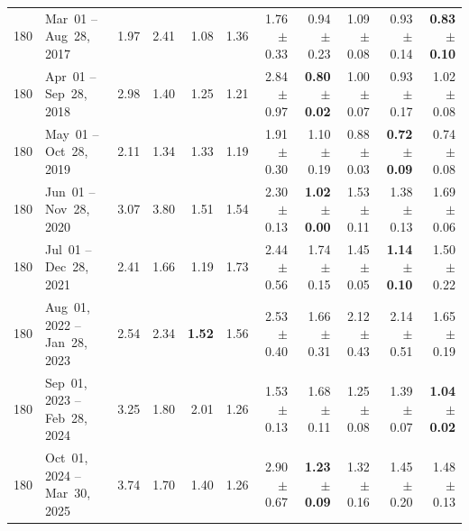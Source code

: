 \begin{longtable}{r l r r r r r r r r r}
180 & Mar~01 -- Aug~28, 2017 & 1.97 & 2.41 & 1.08 & 1.36 & 1.76{\tiny$\pm$0.33} & 0.94{\tiny$\pm$0.23} & 1.09{\tiny$\pm$0.08} & 0.93{\tiny$\pm$0.14} & \textbf{0.83{\tiny$\pm$0.10}} \\
180 & Apr~01 -- Sep~28, 2018 & 2.98 & 1.40 & 1.25 & 1.21 & 2.84{\tiny$\pm$0.97} & \textbf{0.80{\tiny$\pm$0.02}} & 1.00{\tiny$\pm$0.07} & 0.93{\tiny$\pm$0.17} & 1.02{\tiny$\pm$0.08} \\
180 & May~01 -- Oct~28, 2019 & 2.11 & 1.34 & 1.33 & 1.19 & 1.91{\tiny$\pm$0.30} & 1.10{\tiny$\pm$0.19} & 0.88{\tiny$\pm$0.03} & \textbf{0.72{\tiny$\pm$0.09}} & 0.74{\tiny$\pm$0.08} \\
180 & Jun~01 -- Nov~28, 2020 & 3.07 & 3.80 & 1.51 & 1.54 & 2.30{\tiny$\pm$0.13} & \textbf{1.02{\tiny$\pm$0.00}} & 1.53{\tiny$\pm$0.11} & 1.38{\tiny$\pm$0.13} & 1.69{\tiny$\pm$0.06} \\
180 & Jul~01 -- Dec~28, 2021 & 2.41 & 1.66 & 1.19 & 1.73 & 2.44{\tiny$\pm$0.56} & 1.74{\tiny$\pm$0.15} & 1.45{\tiny$\pm$0.05} & \textbf{1.14{\tiny$\pm$0.10}} & 1.50{\tiny$\pm$0.22} \\
180 & Aug~01, 2022 -- Jan~28, 2023 & 2.54 & 2.34 & \textbf{1.52} & 1.56 & 2.53{\tiny$\pm$0.40} & 1.66{\tiny$\pm$0.31} & 2.12{\tiny$\pm$0.43} & 2.14{\tiny$\pm$0.51} & 1.65{\tiny$\pm$0.19} \\
180 & Sep~01, 2023 -- Feb~28, 2024 & 3.25 & 1.80 & 2.01 & 1.26 & 1.53{\tiny$\pm$0.13} & 1.68{\tiny$\pm$0.11} & 1.25{\tiny$\pm$0.08} & 1.39{\tiny$\pm$0.07} & \textbf{1.04{\tiny$\pm$0.02}} \\
180 & Oct~01, 2024 -- Mar~30, 2025 & 3.74 & 1.70 & 1.40 & 1.26 & 2.90{\tiny$\pm$0.67} & \textbf{1.23{\tiny$\pm$0.09}} & 1.32{\tiny$\pm$0.16} & 1.45{\tiny$\pm$0.20} & 1.48{\tiny$\pm$0.13} \\
\end{longtable}
\endgroup


